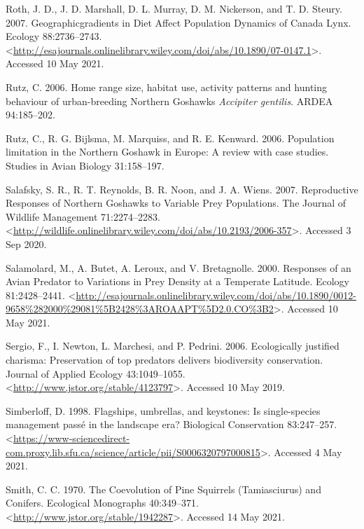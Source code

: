 \documentclass{sfuthesis}
\begin{document}
\leavevmode\hypertarget{ref-roth_geographicgradients_2007}{}%
Roth, J. D., J. D. Marshall, D. L. Murray, D. M. Nickerson, and T. D. Steury. 2007. Geographicgradients in Diet Affect Population Dynamics of Canada Lynx. Ecology 88:2736--2743. \textless{}\url{http://esajournals.onlinelibrary.wiley.com/doi/abs/10.1890/07-0147.1}\textgreater. Accessed 10 May 2021.

\leavevmode\hypertarget{ref-rutz_home_2006}{}%
Rutz, C. 2006. Home range size, habitat use, activity patterns and hunting behaviour of urban-breeding Northern Goshawks \emph{Accipiter gentilis}. ARDEA 94:185--202.

\leavevmode\hypertarget{ref-rutz_population_2006}{}%
Rutz, C., R. G. Bijlsma, M. Marquiss, and R. E. Kenward. 2006. Population limitation in the Northern Goshawk in Europe: A review with case studies. Studies in Avian Biology 31:158--197.

\leavevmode\hypertarget{ref-salafsky_reproductive_2007}{}%
Salafsky, S. R., R. T. Reynolds, B. R. Noon, and J. A. Wiens. 2007. Reproductive Responses of Northern Goshawks to Variable Prey Populations. The Journal of Wildlife Management 71:2274--2283. \textless{}\url{http://wildlife.onlinelibrary.wiley.com/doi/abs/10.2193/2006-357}\textgreater. Accessed 3 Sep 2020.

\leavevmode\hypertarget{ref-salamolard_responses_2000}{}%
Salamolard, M., A. Butet, A. Leroux, and V. Bretagnolle. 2000. Responses of an Avian Predator to Variations in Prey Density at a Temperate Latitude. Ecology 81:2428--2441. \textless{}\url{http://esajournals.onlinelibrary.wiley.com/doi/abs/10.1890/0012-9658\%282000\%29081\%5B2428\%3AROAAPT\%5D2.0.CO\%3B2}\textgreater. Accessed 10 May 2021.

\leavevmode\hypertarget{ref-sergio_ecologically_2006}{}%
Sergio, F., I. Newton, L. Marchesi, and P. Pedrini. 2006. Ecologically justified charisma: Preservation of top predators delivers biodiversity conservation. Journal of Applied Ecology 43:1049--1055. \textless{}\url{http://www.jstor.org/stable/4123797}\textgreater. Accessed 10 May 2019.

\leavevmode\hypertarget{ref-simberloff_flagships_1998}{}%
Simberloff, D. 1998. Flagships, umbrellas, and keystones: Is single-species management passé in the landscape era? Biological Conservation 83:247--257. \textless{}\url{https://www-sciencedirect-com.proxy.lib.sfu.ca/science/article/pii/S0006320797000815}\textgreater. Accessed 4 May 2021.

\leavevmode\hypertarget{ref-smith_coevolution_1970}{}%
Smith, C. C. 1970. The Coevolution of Pine Squirrels (Tamiasciurus) and Conifers. Ecological Monographs 40:349--371. \textless{}\url{http://www.jstor.org/stable/1942287}\textgreater. Accessed 14 May 2021.
\end{document}
